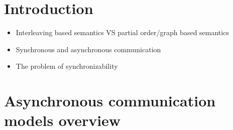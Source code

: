 \documentclass[acmsmall,review,anonymous,screen]{acmart}\settopmatter{printfolios=true,printccs=false,printacmref=true}
\begin{document}




\maketitle

\section{Introduction}
\begin{itemize}
  \item Interleaving based semantics VS partial order/graph based semantics
  \item Synchronous and asynchronous communication
  \item The problem of synchronizability
\end{itemize}


\section{Asynchronous communication models overview}
\label{sec:com_models_overview}
\end{document}
